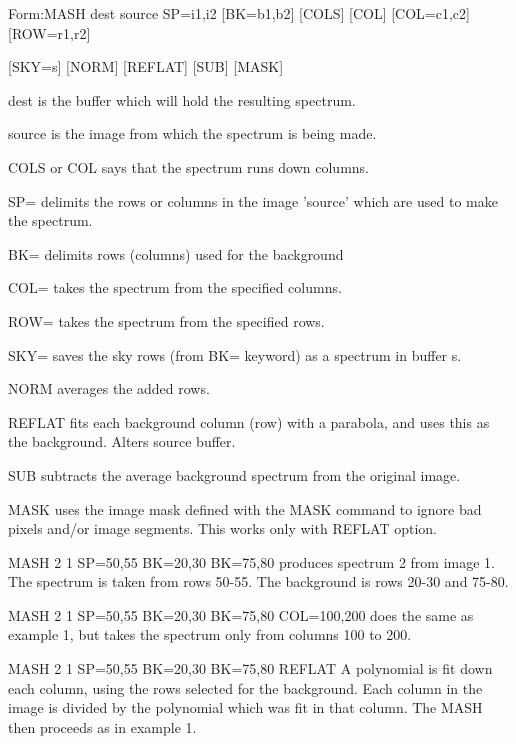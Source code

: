 {\newpage\clearpage
{}%
\begin{command}
  \item[Form:MASH dest source SP=i1,i2 {[BK=b1,b2]} {[COLS]} {[COL]} 
       {[COL=c1,c2]} {[ROW=r1,r2]}\hfill]{}
  \item{{[SKY=s]} {[NORM]} {[REFLAT]} {[SUB]} {[MASK]}}
  \item[dest\hfill]{is the buffer which will hold the resulting spectrum.}
  \item[source\hfill]{is the image from which the spectrum is being made.}
  \item[COLS or COL\hfill]{says that the spectrum runs down columns.}
  \item[SP=\hfill]{delimits the rows or columns in the image 
        'source' which are used to make the spectrum.}
  \item[BK=\hfill]{delimits rows (columns) used for the background}
  \item[COL=\hfill]{takes the spectrum from the specified columns.}
  \item[ROW=\hfill]{takes the spectrum from the specified rows.}
  \item[SKY=\hfill]{saves the sky rows (from BK= keyword) as a
        spectrum in buffer s.}
  \item[NORM\hfill]{averages the added rows.}
  \item[REFLAT\hfill]{fits each background column (row) with a parabola, 
        and uses this as the background.  Alters source buffer.}
  \item[SUB\hfill]{subtracts the average background spectrum from
        the original image.}
  \item[MASK\hfill]{uses the image mask defined with the MASK
       command to ignore bad pixels and/or image}
       segments.  This works only with REFLAT option.
\end{command}%
\lthtmlfigureZ
\lthtmlcheckvsize\clearpage}

{\newpage\clearpage
{}%
\begin{example}
  \item[MASH 2 1 SP=50,55 BK=20,30 BK=75,80\hfill]{ produces spectrum 2
       from image 1.  The spectrum is taken from rows 50-55.  The
       background is rows 20-30 and 75-80.}
\par\item[MASH 2 1 SP=50,55 BK=20,30 BK=75,80 COL=100,200\hfill]{ does the
       same as example 1, but takes the spectrum only from columns 100 to
       200.}
\par\item[MASH 2 1 SP=50,55 BK=20,30 BK=75,80 REFLAT\hfill]{ A polynomial is
       fit down each column, using the rows selected for the background.
       Each column in the image is divided by the polynomial which was fit
       in that column.  The MASH then proceeds as in example 1.}
\end{example}%
\lthtmlfigureZ
\lthtmlcheckvsize\clearpage}

